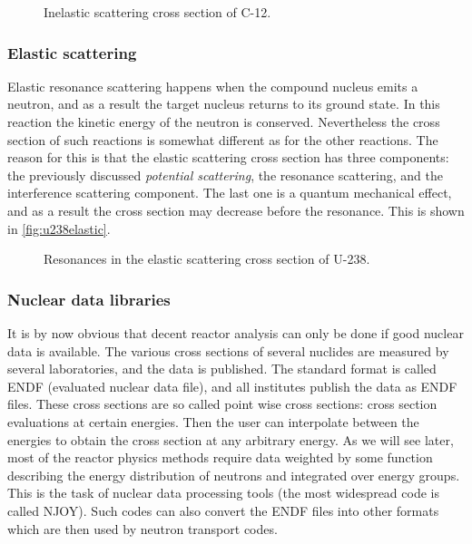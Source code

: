 \begin{figure}[ht!]
\protect {}\protect
\caption{\label{fig:c12inelastic} \footnotesize{Inelastic scattering cross section of C-12.}}
\end{figure}

\subsubsection*{Elastic scattering}

Elastic resonance scattering happens when the compound nucleus emits a neutron, and as a result the target nucleus returns to its ground state. In this reaction the kinetic energy of the neutron is conserved. Nevertheless the cross section of such reactions is somewhat different as for the other reactions. The reason for this is that the elastic scattering cross section has three components: the previously discussed \textit{potential scattering}, the resonance scattering, and the interference scattering component. The last one is a quantum mechanical effect, and as a result the cross section may decrease before the resonance. This is shown in \autoref{fig:u238elastic}.

\begin{figure}[ht!]
\protect {}\protect
\caption{\label{fig:u238elastic} \footnotesize{Resonances in the elastic scattering cross section of U-238.}}
\end{figure}

\subsubsection{Nuclear data libraries}

It is by now obvious that decent reactor analysis can only be done if good nuclear data is available. The various cross sections of several nuclides are measured by several laboratories, and the data is published. The standard format is called ENDF (evaluated nuclear data file), and all institutes publish the data as ENDF files. These cross sections are so called point wise cross sections: cross section evaluations at certain energies. Then the user can interpolate between the energies to obtain the cross section at any arbitrary energy. As we will see later, most of the reactor physics methods require data weighted by some function describing the energy distribution of neutrons and integrated over energy groups. This is the task of nuclear data processing tools (the most widespread code is called NJOY). Such codes can also convert the ENDF files into other formats which are then used by neutron transport codes.

